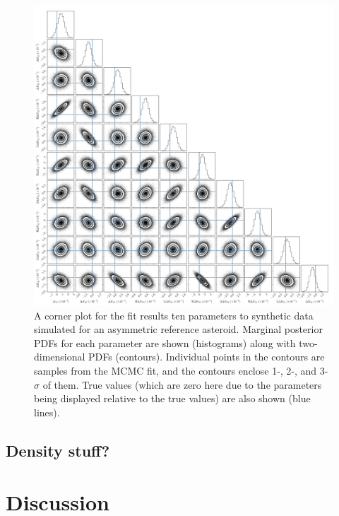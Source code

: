 \documentclass[fleqn,usenatbib]{mnras}
\begin{document}
\begin{figure}
  \centering
  \includegraphics[width=\textwidth]{figs/example-corner.pdf}
  \caption{A corner plot for the fit results ten parameters to synthetic data simulated for an asymmetric reference asteroid. Marginal posterior PDFs for each parameter are shown (histograms) along with two-dimensional PDFs (contours). Individual points in the contours are samples from the MCMC fit, and the contours enclose 1-, 2-, and 3-$\sigma$ of them. True values (which are zero here due to the parameters being displayed relative to the true values) are also shown (blue lines).}
  \label{fig:example-corner}
\end{figure}

\subsection{Density stuff?}




\section{Discussion}
\label{sec:discussion}


\end{document}
